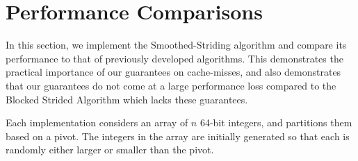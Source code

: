 \documentclass[11pt]{article}
\theoremstyle{remark}
\theoremstyle{remark}
\begin{document}

\section{Performance Comparisons}\label{secexp}

In this section, we implement the Smoothed-Striding algorithm and compare its performance to that of previously developed algorithms.
This demonstrates the practical importance of our guarantees on cache-misses, and also demonstrates that our guarantees do not come at a large performance loss compared to the Blocked Strided Algorithm which lacks these guarantees.

Each implementation considers an array of $n$ 64-bit integers, and
partitions them based on a pivot. The integers in the array are
initially generated so that each is randomly either larger or smaller
than the pivot.


\end{document}

